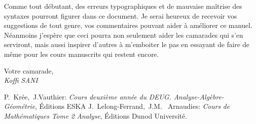 \documentclass[11pt, a4paper]{book}
\begin{document}
 Comme tout d\'ebutant, des erreurs typographiques et de mauvaise ma\^itrise des syntaxes pourront figurer dans ce document. Je serai heureux de recevoir vos suggestions de tout genre, vos commentaires pouvant aider \`a am\'eliorer ce manuel. N\'eanmoins j'esp\`ere que ceci pourra non seulement aider les camarades qui s'en serviront, mais aussi inspirer d'autres \`a m'emboiter le pas en essayant de faire de m\^eme pour les cours manuscrits qui restent encore. \\
\begin{flushright}
Votre camarade,\\
\vspace{1cm}
\emph{Koffi SANI } \\ %
\end{flushright}
\tableofcontents
\setcounter{tocdepth}{3}
\newcommand{\ud}{\mathrm{d}}
\newcommand{\lo}{\mathrm{Log}}
\newcommand{\arct}{\mathrm{Arctan}}


\begin{thebibliography}{99} 
 P.~Kr\'ee,~J.Vauthier: \emph{Cours deuxi\`eme ann\'ee du DEUG. Analyse-Alg\`ebre-G\'eom\'etrie,}  
\'Editions ESKA 
 J.~Lelong-Ferrand,~J.M. ~Arnaudies: \emph{Cours de Math\'ematiques Tome 2 Analyse},  
\'Editions Dunod Universit\'e.
\end{thebibliography}
\end{document}
